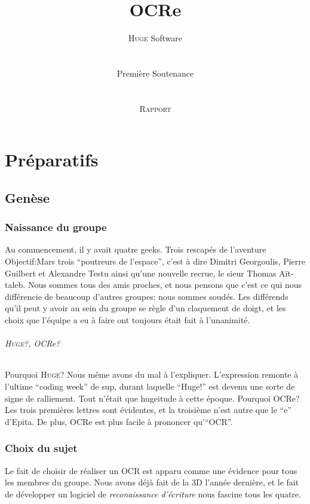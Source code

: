 \documentclass[]{report}
\title{OCRe}
\author{ \textsc{Huge} Software \\
\\
\\
Premi\`ere Soutenance \\
\\
\\
\textsc{Rapport}}
\date{}
\begin{document}
\ifpdf {} \else {} \fi

\maketitle

\pagebreak

\tableofcontents 
\pagebreak

\part{Pr\'eparatifs} 

\label{prt:preparatifs}

\chapter{Gen\`ese} %
\label{cha:genese}
	\section{Naissance du groupe} %
	\label{sec:naissance_du_groupe} 
		Au commencement, il y avait quatre geeks. Trois rescap\'es de l'aventure Objectif:Mars trois ``poutreurs de l'espace'', c'est \`a dire Dimitri Georgoulis, Pierre Guilbert et Alexandre Testu ainsi qu'une nouvelle recrue, le sieur Thomas A\"it-taleb. Nous sommes tous des amis proches, et nous pensons que c'est ce qui nous diff\'erencie de beaucoup d'autres groupes: nous sommes soud\'es. Les diff\'erends qu'il peut y avoir au sein du groupe se r\`egle d'un claquement de doigt, et les choix que l'\'equipe a eu \`a faire ont toujours \'etait fait \`a l'unanimit\'e.
		\paragraph{\textsc{Huge}?, OCRe?} %
		\label{par:huge_ocre_}
			Pourquoi \textsc{Huge}? Nous m\^eme avons du mal \`a l'expliquer. L'expression remonte \`a l'ultime ``coding week'' de sup, durant laquelle ``Huge!'' est devenu une sorte de signe de ralliement. Tout n'\'etait que hugeitude \`a cette \'epoque.
			Pourquoi OCRe? Les trois premi\`eres lettres sont \'evidentes, et la troisi\`eme n'est autre que le ``e'' d'Epita. De plus, OCRe est plus facile \`a prononcer qu'``OCR''.

	\section{Choix du sujet} %
	\label{sec:choix_du_sujet} 
		Le fait de choisir de r\'ealiser un OCR est apparu comme une \'evidence pour tous les membres du groupe. Nous avons d\'ej\`a fait de la 3D l'ann\'ee derni\`ere, et le fait de d\'evelopper un logiciel de \emph{reconaissance d'\'ecriture} nous fascine tous les quatre. 
\end{document}
